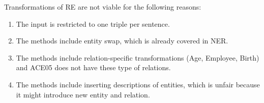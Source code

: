 \documentclass[11pt]{article}
\begin{document}
Transformations of RE are not viable for the following reasons:
\begin{enumerate}
\vspace{-2.5mm}
\item The input is restricted to one triple per sentence.
\vspace{-2.5mm}
\item The methods include entity swap, which is already covered in NER.
\vspace{-2.5mm}
\item The methods include relation-specific transformations (Age, Employee, Birth) and ACE05 does not have these type of relations.
\vspace{-2.5mm}
\item The methods include inserting descriptions of entities, which is unfair because it might introduce new entity and relation.
\end{enumerate}
\end{document}
